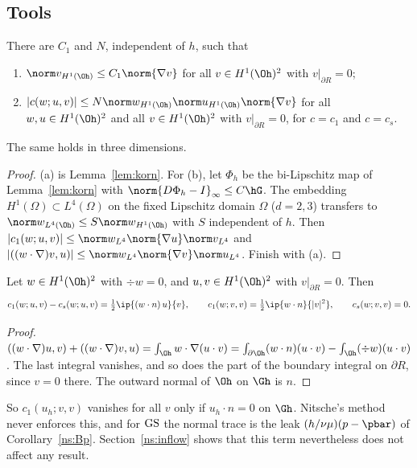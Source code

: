 \subsection{Tools}

\begin{lemma}\label{ns:tri}
There are $C_1$ and $N$, independent of $h$, such that
\begin{enumerate}[label=(\alph*)]
\item $\norm v_{H^1(\Oh)}\le C_1\norm{\nabla v}$ for all $v\in H^1(\Oh)^2$ with $v|_{\partial R}=0$;
\item $|c(w;u,v)|\le N\norm w_{H^1(\Oh)}\norm u_{H^1(\Oh)}\norm{\nabla v}$ for all $w,u\in H^1(\Oh)^2$ and all $v\in H^1(\Oh)^2$ with $v|_{\partial R}=0$, for $c=c_1$ and $c=c_s$.
\end{enumerate}
The same holds in three dimensions.
\end{lemma}

\begin{proof}
(a) is Lemma~\ref{lem:korn}. For (b), let $\Phi_h$ be the bi-Lipschitz map of Lemma~\ref{lem:korn} with $\norm{D\Phi_h-I}_\infty\le C\hG$. The embedding $H^1(\Omega)\subset L^4(\Omega)$ on the fixed Lipschitz domain $\Omega$ ($d=2,3$) transfers to $\norm w_{L^4(\Oh)}\le S\norm w_{H^1(\Oh)}$ with $S$ independent of $h$. Then $|c_1(w;u,v)|\le\norm w_{L^4}\norm{\nabla u}\norm v_{L^4}$ and $|((w\cdot\nabla)v,u)|\le\norm w_{L^4}\norm{\nabla v}\norm u_{L^4}$. Finish with (a).
\end{proof}

\begin{lemma}\label{ns:bdry}
Let $w\in H^1(\Oh)^2$ with $\div w=0$, and $u,v\in H^1(\Oh)^2$ with $v|_{\partial R}=0$. Then
\[
c_1(w;u,v)-c_s(w;u,v)=\tfrac12\ip{(w\cdot n)\,u}{v},\qquad c_1(w;v,v)=\tfrac12\ip{w\cdot n}{|v|^2},\qquad c_s(w;v,v)=0 .
\]
\end{lemma}

\begin{proof}
$((w\cdot\nabla)u,v)+((w\cdot\nabla)v,u)=\int_{\Oh}w\cdot\nabla(u\cdot v)=\int_{\partial\Oh}(w\cdot n)(u\cdot v)-\int_{\Oh}(\div w)(u\cdot v)$. The last integral vanishes, and so does the part of the boundary integral on $\partial R$, since $v=0$ there. The outward normal of $\Oh$ on $\Gh$ is $n$.
\end{proof}

So $c_1(u_h;v,v)$ vanishes for all $v$ only if $u_h\cdot n=0$ on $\Gh$. Nitsche's method never enforces this, and for $\mathrm{GS}$ the normal trace is the leak $(h/\nu\mu)(p-\pbar)$ of Corollary~\ref{ns:Bp}. Section~\ref{ns:inflow} shows that this term nevertheless does not affect any result.

